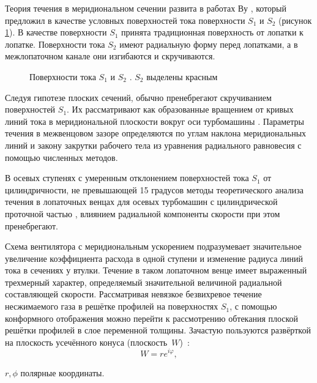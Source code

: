 Теория течения в меридиональном сечении развита в работах Ву \cite{Wu1952}, который предложил в качестве условных поверхностей тока поверхности \(S_1\) и \(S_2\) (рисунок \ref{fig:s1s2}). В качестве поверхности \(S_1\) принята традиционная поверхность от лопатки к лопатке. Поверхности тока \(S_2\) имеют радиальную форму перед лопатками, а в межлопаточном канале они изгибаются и скручиваются.

\begin{figure} [ht]
	\caption{Поверхности тока \(S_1\) и \(S_2\) \cite{Wu1952}. \(S_2\) выделены красным} 
	\label{fig:s1s2}
\end{figure}

Следуя гипотезе плоских сечений, обычно пренебрегают скручиванием поверхностей \(S_1\). Их рассматривают как образованные вращением от кривых линий тока в меридиональной плоскости вокруг оси турбомашины \cite{Sirotkin1972}. Параметры течения в межвенцовом зазоре определяются по углам наклона меридиональных линий и закону закрутки рабочего тела из уравнения радиального равновесия \cite{Smith1966} с помощью численных методов.

В осевых ступенях с умеренным отклонением поверхностей тока \(S_1\) от цилиндричности, не превышающей 15 градусов методы теоретического анализа течения в лопаточных венцах для осевых турбомашин с цилиндрической проточной частью \cite{Sirotkin1972,Stepanov1962}, влиянием радиальной компоненты скорости при этом пренебрегают. 

Схема вентилятора с меридиональным ускорением подразумевает значительное увеличение коэффициента расхода в одной ступени и изменение радиуса линий тока в сечениях у втулки. Течение в таком лопаточном венце имеет выраженный трехмерный характер, определяемый значительной величиной радиальной составляющей скорости. Рассматривая невязкое безвихревое течение несжимаемого газа в решётке профилей на поверхностях \(S_1\), с помощью конформного отображения можно перейти к рассмотрению обтекания плоской решётки профилей в слое переменной толщины. Зачастую пользуются развёрткой на плоскость усечённого конуса (плоскость~\(W\))~\cite{Sachkova2000}: 
\begin{equation}
	W = r e^{i\varphi},
\end{equation}
\begin{eqexpl}
	\item{\(r, \phi\)} полярные координаты.
\end{eqexpl}

